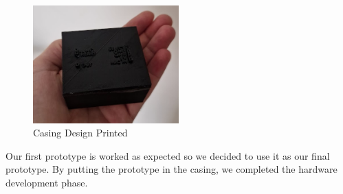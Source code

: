 \begin{figure}[h]
    \centering
    \includegraphics[width=0.5\textwidth]{assets/3d-design-printed.png}
    \caption{Casing Design Printed}
    \label{fig:casing_design_printed}
\end{figure}

Our first prototype is worked as expected so we decided to use it as our final prototype. By putting the prototype in the casing, we completed the hardware development phase.
